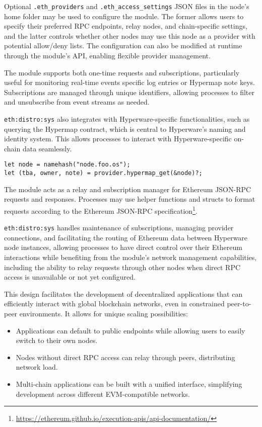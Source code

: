 \documentclass[runningheads]{llncs}
\begin{document}
Optional \verb|.eth_providers| and \verb|.eth_access_settings| JSON files in the node's home folder may be used to configure the module. The former allows users to specify their preferred RPC endpoints, relay nodes, and chain-specific settings, and the latter controls whether other nodes may use this node as a provider with potential allow/deny lists. The configuration can also be modified at runtime through the module's API, enabling flexible provider management.

The module supports both one-time requests and subscriptions, particularly useful for monitoring real-time events specific log entries or Hypermap note keys. Subscriptions are managed through unique identifiers, allowing processes to filter and unsubscribe from event streams as needed.

\verb|eth:distro:sys| also integrates with Hyperware-specific functionalities, such as querying the Hypermap contract, which is central to Hyperware's naming and identity system. This allows processes to interact with Hyperware-specific on-chain data seamlessly.

\begin{verbatim}
let node = namehash("node.foo.os");
let (tba, owner, note) = provider.hypermap_get(&node)?;
\end{verbatim}

The module acts as a relay and subscription manager for Ethereum JSON-RPC requests and responses. Processes may use helper functions and structs to format requests according to the Ethereum JSON-RPC specification\footnote{\url{https://ethereum.github.io/execution-apis/api-documentation/}}.

\verb|eth:distro:sys| handles maintenance of subscriptions, managing provider connections, and facilitating the routing of Ethereum data between Hyperware node instances, allowing processes to have direct control over their Ethereum interactions while benefiting from the module's network management capabilities, including the ability to relay requests through other nodes when direct RPC access is unavailable or not yet configured.

This design facilitates the development of decentralized applications that can efficiently interact with global blockchain networks, even in constrained peer-to-peer environments. It allows for unique scaling possibilities:

\begin{itemize}
	\item Applications can default to public endpoints while allowing users to easily switch to their own nodes.
	\item Nodes without direct RPC access can relay through peers, distributing network load.
	\item Multi-chain applications can be built with a unified interface, simplifying development across different EVM-compatible networks.
\end{itemize}
\end{document}
